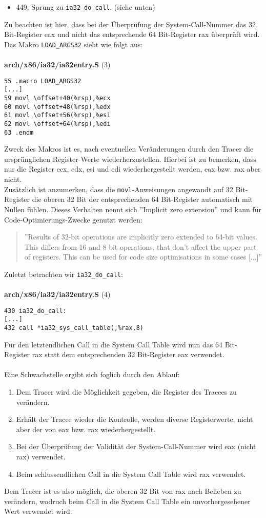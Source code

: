 \documentclass[11pt,a4paper]{article}
\begin{document}
{\begin{itemize}
\item 449: Sprung zu \texttt{ia32\_do\_call}. (siehe unten)
\end{itemize}
Zu beachten ist hier, dass bei der Überprüfung der System-Call-Nummer das 32 Bit-Register eax und nicht das entsprechende 64 Bit-Register rax überprüft wird.\\
Das Makro \texttt{LOAD\_ARGS32} sieht wie folgt aus:\\
\\
\textbf{arch/x86/ia32/ia32entry.S} (3)
\begin{lstlisting}[frame=single]
55 .macro LOAD_ARGS32
[...]
59 movl \offset+40(%rsp),%ecx
60 movl \offset+48(%rsp),%edx
61 movl \offset+56(%rsp),%esi
62 movl \offset+64(%rsp),%edi
63 .endm
\end{lstlisting}
Zweck des Makros ist es, nach eventuellen Veränderungen durch den Tracer die ursprünglichen Register-Werte wiederherzustellen. Hierbei ist zu bemerken, dass nur die Register ecx, edx, esi und edi wiederhergestellt werden, eax bzw. rax aber nicht.\\
Zusätzlich ist anzumerken, dass die \texttt{movl}-Anweisungen angewandt auf 32 Bit-Register die oberen 32 Bit der entsprechenden 64 Bit-Register automatisch mit Nullen fühlen. Dieses Verhalten nennt sich ''Implicit zero extension'' und kann für Code-Optimierungs-Zwecke genutzt werden:
\begin{quote}
''Results of 32-bit operations are implicitly zero extended to 64-bit values. This differs from 16 and 8 bit operations, that don't affect the upper part of registers. This can be used for code size optimisations in some cases [...]'' \cite{X860}
\end{quote}
Zuletzt betrachten wir \texttt{ia32\_do\_call}:\\
\\
\textbf{arch/x86/ia32/ia32entry.S} (4)
\begin{lstlisting}[frame=single]
430 ia32_do_call:
[...]
432 call *ia32_sys_call_table(,%rax,8)
\end{lstlisting}
Für den letztendlichen Call in die System Call Table wird nun das 64 Bit-Register rax statt dem entsprechenden 32 Bit-Register eax verwendet.\\
\\
Eine Schwachstelle ergibt sich foglich durch den Ablauf:
\begin{enumerate}
\item Dem Tracer wird die Möglichkeit gegeben, die Register des Tracees zu verändern.
\item Erhält der Tracee wieder die Kontrolle, werden diverse Registerwerte, nicht aber der von eax bzw. rax wiederhergestellt.
\item Bei der Überprüfung der Validität der System-Call-Nummer wird eax (nicht rax) verwendet.
\item Beim schlussendlichen Call in die System Call Table wird rax verwendet.
\end{enumerate}
Dem Tracer ist es also möglich, die oberen 32 Bit von rax nach Belieben zu verändern, wodruch beim Call in die System Call Table ein unvorhergesehener Wert verwendet wird.
}
\end{document}
